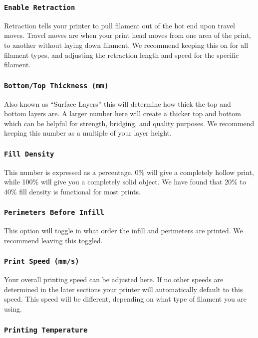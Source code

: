 \subsubsection{\texttt{Enable Retraction}}
Retraction tells your printer to pull filament out of the hot end upon travel moves. Travel moves are when your print head moves from one area of the print, to another without laying down filament. We recommend keeping this on for all filament types, and adjusting the retraction length and speed for the specific filament.

\subsubsection{\texttt{Bottom/Top Thickness (mm)}}
Also known as ``Surface Layers'' this will determine how thick the top and bottom layers are. A larger number here will create a thicker top and bottom which can be helpful for strength, bridging, and quality purposes. We recommend keeping this number as a multiple of your layer height.

\subsubsection{\texttt{Fill Density}}
This number is expressed as a percentage. 0\% will give a completely hollow print, while 100\% will give you a completely solid object. We have found that 20\% to 40\% fill density is functional for most prints.

\subsubsection{\texttt{Perimeters Before Infill}}
This option will toggle in what order the infill and perimeters are printed. We recommend leaving this toggled.
\subsubsection{\texttt{Print Speed (mm/s)}}
Your overall printing speed can be adjusted here. If no other speeds are determined in the later sections your printer will automatically default to this speed. This speed will be different, depending on what type of filament you are using.

\subsubsection{\texttt{Printing Temperature}}

